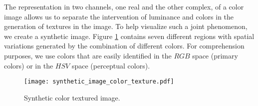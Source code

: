 The representation in two channels, one real and the other complex, of a color image allows us to separate the intervention of luminance and colors in the generation of textures in the image. To help visualize such a joint phenomenon, we create a synthetic image. Figure \ref{fig:synthetic_color_texture_image} contains seven different regions with spatial variations generated by the combination of different colors. For comprehension purposes, we use colors that are easily identified in the $RGB$ space (primary colors) or in the $HSV$ space (perceptual colors).

\begin{figure}
    \texttt{[image: synthetic\_image\_color\_texture.pdf]}
\caption{Synthetic color textured image.}\label{fig:synthetic_color_texture_image}
\end{figure}

